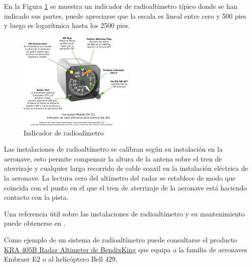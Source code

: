 
En la Figura \ref{fig:radioaltimetro.indicador} 
se muestra un indicador de radioalt\'imetro t\'ipico donde se han indicado sus partes, puede apreciarse que la escala es lineal entre cero y 500 pies y luego es logar\'itmica hasta los 2500 pies.

\begin{figure}[!htb]
  \centering
  \includegraphics[width=0.5\textwidth]{06.radionavegacion/Imagenes/06.05.radar/06_radar_0004.png}
  \caption{Indicador de radioal\'imetro}
  \label{fig:radioaltimetro.indicador}
\end{figure}


Las instalaciones de radioalt\'imetro se calibran seg\'un su instalación en la aeronave, esto permite compensar la altura de la antena sobre el tren de aterrizaje y cualquier largo recorrido de cable coaxil en la instalación eléctrica de la aeronave. 
La lectura cero del altímetro del radar se establece de modo que coincida con el punto en el que el tren de aterrizaje de la aeronave está haciendo contacto con la pista. 

Una referencia útil sobre las instalaciones de radioalt\'imetro y su mantenimiento puede obtenerse en  \protect\cite{Radioaltimetro_airbus}.

Como ejemplo de un sistema de radioalt\'imetro puede consultarse el producto \href{https://www.bendixking.com/en/products/nc/navigation-and-communication/kra-405b}{KRA 405B Radar Altimeter de BendixKing} que equipa a la familia de aeronaves Embraer E2 o al helicóptero Bell 429. 

